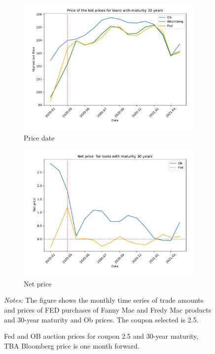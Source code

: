 \documentclass[11pt,a4paper]{article}
\begin{document}
\begin{figure}[h]
    \centering
    \begin{subfigure}[b]{0.49\textwidth}
      \includegraphics[width=0.998\textwidth]{../results/figures/fed_price_mean_mat30_loan1_timeseries_nrmonthly_2.5_4__fed_ob}
      \caption{Price date}
     \end{subfigure}
     \begin{subfigure}[b]{0.49\textwidth}
      \includegraphics[width=0.998\textwidth]{../results/figures/fed_price_mean_mat30_loan1_timeseries_nrmonthly__normalized_fed_ob}
      \caption{Net price}
     \end{subfigure}
     \caption{Fed and OB auction prices for coupon 2.5 and 30-year maturity, TBA Bloomberg price is one month forward. } 
     \begin{minipage}{\textwidth}
      \footnotesize{\textit{Notes:} The figure shows the monthly time series of trade amounts and prices of FED  purchases of Fanny Mae and Fredy Mac products and 30-year maturity and Ob prices. The coupon selected is 2.5. } 
        \end{minipage}
\end{figure}
\end{document}
